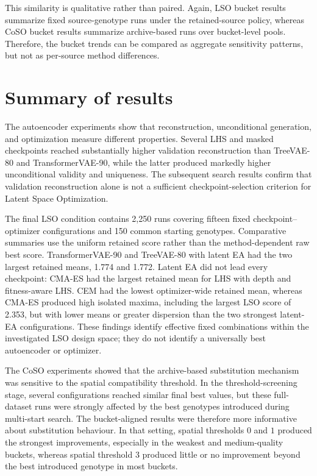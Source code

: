 This similarity is qualitative rather than paired. Again, LSO bucket results summarize fixed source-genotype runs under the retained-source policy, whereas CoSO bucket results summarize archive-based runs over bucket-level pools. Therefore, the bucket trends can be compared as aggregate sensitivity patterns, but not as per-source method differences.

\section{Summary of results}

The autoencoder experiments show that reconstruction, unconditional generation, and optimization measure different properties. Several LHS and masked checkpoints reached substantially higher validation reconstruction than TreeVAE-80 and TransformerVAE-90, while the latter produced markedly higher unconditional validity and uniqueness. The subsequent search results confirm that validation reconstruction alone is not a sufficient checkpoint-selection criterion for Latent Space Optimization.

The final LSO condition contains 2,250 runs covering fifteen fixed checkpoint--optimizer configurations and 150 common starting genotypes. Comparative summaries use the uniform retained score rather than the method-dependent raw best score. TransformerVAE-90 and TreeVAE-80 with latent EA had the two largest retained means, 1.774 and 1.772. Latent EA did not lead every checkpoint: CMA-ES had the largest retained mean for LHS with depth and fitness-aware LHS. CEM had the lowest optimizer-wide retained mean, whereas CMA-ES produced high isolated maxima, including the largest LSO score of 2.353, but with lower means or greater dispersion than the two strongest latent-EA configurations. These findings identify effective fixed combinations within the investigated LSO design space; they do not identify a universally best autoencoder or optimizer.

The CoSO experiments showed that the archive-based substitution mechanism was sensitive to the spatial compatibility threshold. In the threshold-screening stage, several configurations reached similar final best values, but these full-dataset runs were strongly affected by the best genotypes introduced during multi-start search. The bucket-aligned results were therefore more informative about substitution behaviour. In that setting, spatial thresholds \(0\) and \(1\) produced the strongest improvements, especially in the weakest and medium-quality buckets, whereas spatial threshold \(3\) produced little or no improvement beyond the best introduced genotype in most buckets.

